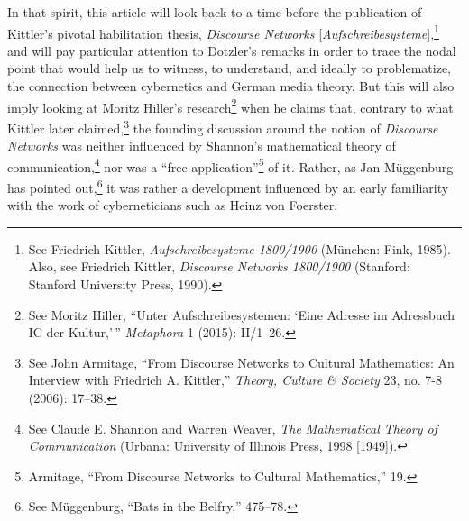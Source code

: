 \documentclass{tufte-handout}
\begin{document}
In that spirit, this article will look back to a time before the
publication of Kittler's pivotal habilitation thesis, \emph{Discourse
Networks} {[}\emph{Aufschreibesysteme}{]},\footnote{See Friedrich
  Kittler, \emph{Aufschreibesysteme 1800/1900} (München: Fink, 1985).
  Also, see Friedrich Kittler, \emph{Discourse Networks 1800/1900}
  (Stanford: Stanford University Press, 1990).} and will pay particular
attention to Dotzler's remarks in order to trace the nodal point that
would help us to witness, to understand, and ideally to problematize,
the connection between cybernetics and German media theory. But this
will also imply looking at Moritz Hiller's research\footnote{See Moritz
  Hiller, ``Unter Aufschreibesystemen: `Eine Adresse im
  \sout{Adressbuch} IC der Kultur,'\,'' \emph{Metaphora} 1 (2015):
  II/1--26.} when he claims that, contrary to what Kittler later
claimed,\footnote{See John Armitage, ``From Discourse Networks to
  Cultural Mathematics: An Interview with Friedrich A. Kittler,''
  \emph{Theory, Culture \& Society} 23, no. 7-8 (2006): 17--38.} the
founding discussion around the notion of \emph{Discourse Networks} was
neither influenced by Shannon's mathematical theory of
communication,\footnote{See Claude E. Shannon and Warren Weaver,
  \emph{The Mathematical Theory of Communication} (Urbana: University of
  Illinois Press, 1998 {[}1949{]}).} nor was a ``free
application''\footnote{Armitage, ``From Discourse Networks to Cultural
  Mathematics,'' 19.} of it\emph{.} Rather, as Jan Müggenburg has
pointed out,\footnote{See Müggenburg, ``Bats in the Belfry,'' 475--78.}
it was rather a development influenced by an early familiarity with the
work of cyberneticians such as Heinz von Foerster.
\end{document}
